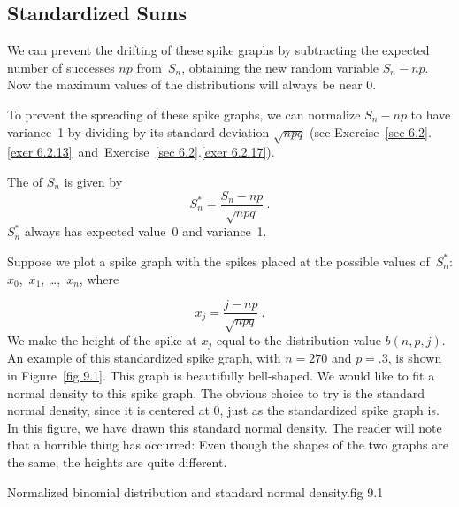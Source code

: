 \subsection*{Standardized Sums}
We can prevent the drifting of these spike graphs by subtracting the expected
number of successes $np$ from~$S_n$, obtaining the new random variable $S_n -
np$.  Now the maximum values of the distributions will always be near 0.
\par
To prevent the spreading of these spike graphs, we can normalize $S_n - np$ to
have variance~1 by dividing by its standard deviation $\sqrt{npq}$ (see
Exercise~\ref{sec 6.2}.\ref{exer 6.2.13}~and~Exercise~\ref{sec 6.2}.\ref{exer 6.2.17}).

\begin{definition}
The  of $S_n$ is given by
\[
S_n^* = \frac {S_n - np}{\sqrt{npq}}\ .
\]
$S_n^*$ always has expected value~0 and variance~1.
\end{definition}

Suppose we plot a spike graph with the spikes placed at the possible values
of~$S_n^*$: $x_0$,~$x_1$, \dots,~$x_n$, where

\begin{equation}
x_j = \frac {j - np}{\sqrt{npq}}\ .
\label{eq 9.1}
\end{equation}                                                        
We make the height of the spike at $x_j$ equal to the distribution value $b(n, p, j)$.  An example
of this standardized spike graph, with $n = 270$ and $p = .3$, is shown in Figure~\ref{fig 9.1}.
This graph is beautifully bell-shaped.  We would like to fit a normal density to this
spike graph.  The obvious choice to try is the standard normal density, since it is centered at
0, just as the standardized spike graph is.  In this figure, we have drawn this standard normal
density.  The reader will note that a horrible thing has occurred:  Even though the shapes of the
two graphs are the same, the heights are quite different.

{Normalized binomial distribution and standard normal density.}{fig 9.1} 

